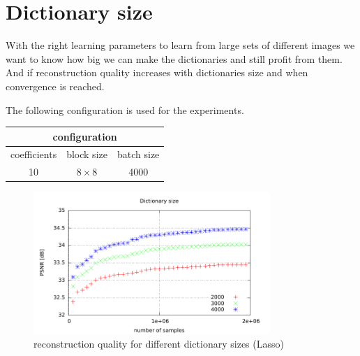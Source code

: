 
\clearpage

\section{Dictionary size}
With the right learning parameters to learn from large sets of
different images we want to know how big we can make the dictionaries and
still profit from them. And if reconstruction quality increases with
dictionaries size and when convergence is reached. 

The following configuration is used for the experiments. 
\begin{table}[H]
\centering
\begin{tabular}{| c | c | c |}
\hline
\multicolumn{3}{|c|}{configuration}\\
\hline
coefficients & block size & batch size \\
\hline
10 & $8\times 8$ & 4000  \\
\hline
\end{tabular}
\end{table}

\begin{figure}[h]
\centering
\includegraphics[width = 0.8\textwidth]{../tests/results/dictSizeLassoGod.pdf}
\caption{reconstruction quality for different dictionary sizes (Lasso)}
\label{fig:dict size}
\end{figure}




